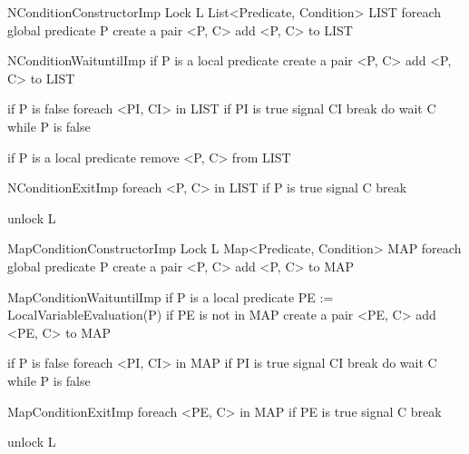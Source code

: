 \documentclass[preprint]{sigplanconf}
\begin{document}
\begin{SaveVerbatim}{NConditionConstructorImp}
Lock L
List<Predicate, Condition> LIST
foreach global predicate P
  create a pair <P, C>
  add <P, C> to LIST
\end{SaveVerbatim}

\begin{SaveVerbatim}{NConditionWaituntilImp}
if P is a local predicate 
  create a pair <P, C>
  add <P, C> to LIST
 
if P is false 
  foreach <PI, CI> in LIST
    if PI is true
      signal CI
      break
  do 
    wait C
  while P is false

if P is a local predicate 
  remove <P, C> from LIST
\end{SaveVerbatim}

\begin{SaveVerbatim}{NConditionExitImp}
foreach <P, C> in LIST
  if P is true
    signal C
    break

unlock L
\end{SaveVerbatim}


\begin{SaveVerbatim}{MapConditionConstructorImp}
Lock L
Map<Predicate, Condition> MAP
foreach global predicate P
  create a pair <P, C>
  add <P, C> to MAP 
\end{SaveVerbatim}

\begin{SaveVerbatim}{MapConditionWaituntilImp}
if P is a local predicate 
  PE := LocalVariableEvaluation(P)
  if PE is not in MAP
    create a pair <PE, C>
    add <PE, C> to MAP
 
if P is false 
  foreach <PI, CI> in MAP
    if PI is true
      signal CI
      break
  do 
    wait C
  while P is false
\end{SaveVerbatim}

\begin{SaveVerbatim}{MapConditionExitImp}
foreach <PE, C> in MAP
  if PE is true
    signal C
    break

unlock L
\end{SaveVerbatim}
\end{document}
